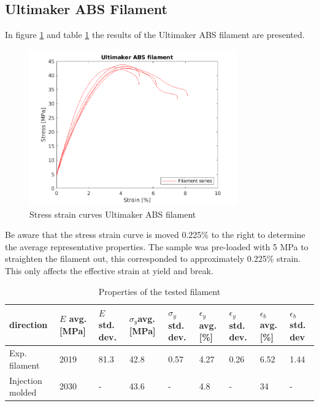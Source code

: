 \subsection{Ultimaker ABS Filament}
In figure \ref{fig:filamentresults} and table \ref{tab:additionalresults} the results of the Ultimaker ABS filament are presented.
\begin{figure}[H]
    \centering
    \includegraphics[width=0.80\textwidth]{chapter_5_Experimentaltesting/figures/filamentdata.png}
    \caption{Stress strain curves Ultimaker ABS filament}
    \label{fig:filamentresults}
\end{figure}
Be aware that the stress strain curve is moved 0.225\% to the right to determine the average representative properties. The sample was pre-loaded with 5 MPa to straighten the filament out, this corresponded to approximately 0.225\% strain. This only affects the effective strain at yield and break.
\begin{table}
\caption{Properties of the tested filament}
\begin{tabular}{ p{1.5cm}p{1cm}p{1cm}p{1cm}p{1cm}p{1cm}p{1cm}p{1cm}p{1cm}  }
 \hline
direction & $E$ avg. [MPa] & $E$ std. dev. & $\sigma_y$avg. [MPa] & $\sigma_y$ std. dev. & $\epsilon_y$ avg. [\%] & $\epsilon_y$   std. dev. & $\epsilon_b$ avg. [\%] & $\epsilon_b$   std. dev \\
 \hline
Exp. filament & 2019 & 81.3 & 42.8 & 0.57 & 4.27 & 0.26 & 6.52 & 1.44\\
Injection molded \cite{TechnicalUM} & 2030 & - & 43.6 & - & 4.8 & - & 34 & -\\
 \hline
\end{tabular}
     \label{tab:additionalresults}
 \end{table}


